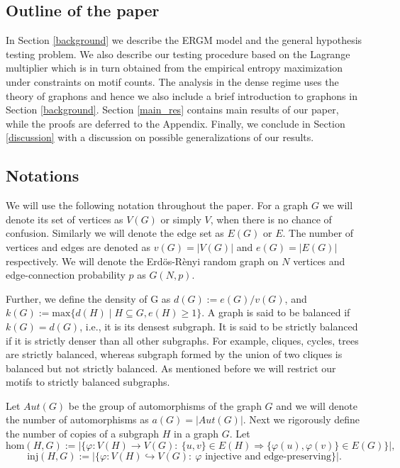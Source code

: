 \documentclass[12pt]{article}
\def\er{ Erd{\"o}s-R{\`e}nyi }
\newcommand{\homc}{\mathrm{hom}}
\newcommand{\injc}{\mathrm{inj}}
\numberwithin{equation}{section}
\begin{document}
\subsection{Outline of the paper}

 In Section \ref{background} we describe the ERGM model and the general hypothesis testing problem. We also describe our testing procedure based on the Lagrange multiplier which is in turn obtained from the empirical entropy maximization under constraints on motif counts. The analysis in the dense regime uses the theory of graphons and hence we also include a brief introduction to graphons in Section \ref{background}.  Section \ref{main_res} contains main results of our paper, while the proofs are deferred to the Appendix.     Finally, we conclude in Section
\ref{discussion} with a discussion on possible generalizations of our
results. 



\subsection{Notations}
We will use the following notation throughout the paper. For a graph $G$ we will denote its set of vertices as $V(G)$ or simply $V$, when there is no chance of confusion. Similarly we will denote the edge set as $E(G)$ or $E$. The number of vertices and edges are denoted as $v(G)=|V(G)|$ and $e(G)=|E(G)|$ respectively. We will denote the \er random graph on $N$ vertices and edge-connection probability $p$ as $G(N,p)$.

Further, we define the density of G as \(d(G) := e(G)/v(G)\), and \(k(G) := \mathrm{max}\{d(H)\mid H\subseteq G, e(H)\geq 1\}\).
A graph is said to be balanced if \(k(G) = d(G)\), i.e., it is its densest subgraph. It is said to be strictly balanced if it is strictly denser than all other subgraphs. For example, cliques, cycles, trees are strictly balanced, whereas subgraph formed by the union of two cliques is balanced but not strictly balanced. As mentioned before we will restrict our motifs to strictly balanced subgraphs.


Let $Aut(G)$ be the group of automorphisms of the graph $G$ and we will denote the number of automorphisms as $a(G)=|Aut(G)|$.  Next we rigorously define the number of copies of a subgraph $H$ in a graph $G$. Let
\[
\homc(H,G)
:= \bigl|\{\varphi: V(H)\to V(G): \ \{u,v\}\in E(H)\Rightarrow \{\varphi(u),\varphi(v)\}\in E(G)\}\bigr|,
\]
\[
\injc(H,G)
:= \bigl|\{\varphi: V(H)\hookrightarrow V(G): \ \varphi \text{ injective and edge-preserving}\}\bigr|.
\]
\end{document}
